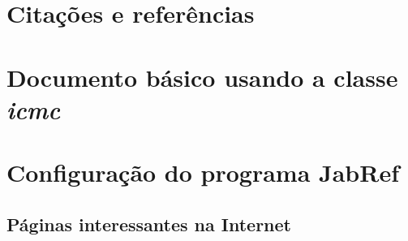 \documentclass[doutorado, spanish, brazil, english]{packages/icmc}
\begin{document}
\chapter{Citações e referências}
\label{chapter:citacoes}



% 

\postextual




\glsaddall
\printglossaries


\begin{apendicesenv}

    \chapter{Documento básico usando a classe \textit{icmc}}
    \label{chapter:documento-basico}
    
    
    \chapter{Configuração do programa JabRef}
    \label{chapter:configuracao-jabref}
    

\end{apendicesenv}



\begin{anexosenv}

    \chapter{Páginas interessantes na Internet} 
    \label{chapter:paginas-interessantes}
    

\end{anexosenv}
\end{document}
